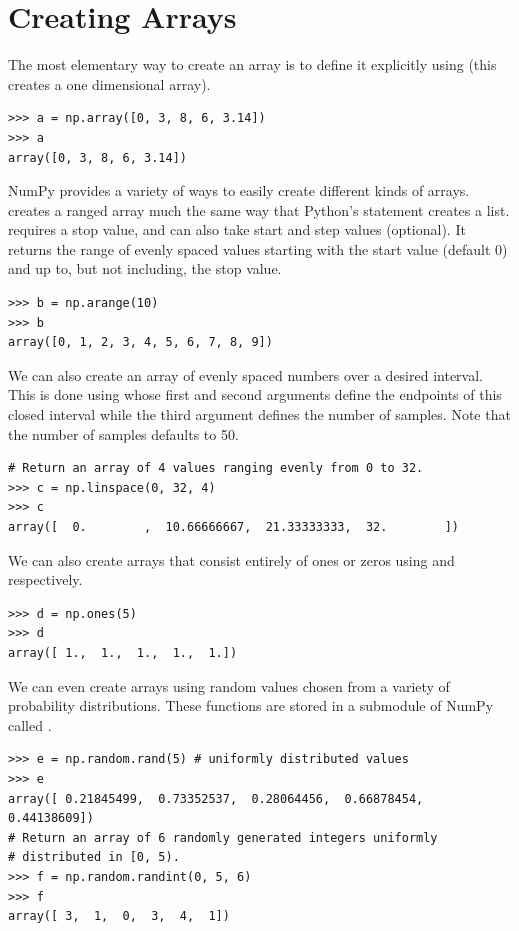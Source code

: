 \section*{Creating Arrays} The most elementary way to create an array is
to define it explicitly using  (this creates a one dimensional array). 
\begin{lstlisting}
>>> a = np.array([0, 3, 8, 6, 3.14]) 
>>> a
array([0, 3, 8, 6, 3.14]) 
\end{lstlisting} 

NumPy provides a variety of
ways to easily create different kinds of arrays. 
creates a ranged array much the same way that Python's 
statement creates a list.  requires a
stop value, and can also take start and step values (optional). It returns the range
of evenly spaced values starting with the start value (default 0) and up to,
but not including, the stop value. 
\begin{lstlisting}
>>> b = np.arange(10) 
>>> b
array([0, 1, 2, 3, 4, 5, 6, 7, 8, 9]) 
\end{lstlisting}
 
We can also create an array of evenly spaced numbers over a desired interval.
This is done using  whose first
and second arguments define the endpoints of this closed interval while 
the third argument defines the number of samples. Note that the number
of samples defaults to 50. 
\begin{lstlisting}
# Return an array of 4 values ranging evenly from 0 to 32.
>>> c = np.linspace(0, 32, 4) 
>>> c
array([  0.        ,  10.66666667,  21.33333333,  32.        ])
\end{lstlisting} 


We can also create arrays that
consist entirely of ones or zeros using  and
 respectively. 
\begin{lstlisting}
>>> d = np.ones(5) 
>>> d
array([ 1.,  1.,  1.,  1.,  1.])
\end{lstlisting} 

We can even create arrays using random values chosen
from a variety of probability distributions. These functions are stored
in a submodule of NumPy called . 
\begin{lstlisting}
>>> e = np.random.rand(5) # uniformly distributed values 
>>> e
array([ 0.21845499,  0.73352537,  0.28064456,  0.66878454,  0.44138609])
# Return an array of 6 randomly generated integers uniformly
# distributed in [0, 5).
>>> f = np.random.randint(0, 5, 6) 
>>> f
array([ 3,  1,  0,  3,  4,  1])

\end{lstlisting} 


